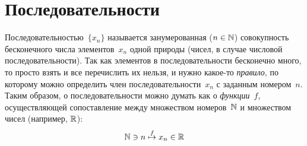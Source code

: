 \documentclass[a4paper,12pt]{article}
\begin{document}
  
  \section{Последовательности}
  
  Последовательностью~$\{x_n\}$ называется занумерованная ($n \hm\in \NN$) совокупность бесконечного числа элементов~$x_n$ одной природы (чисел, в случае числовой последовательности).
  Так как элементов в последовательности бесконечно много, то просто взять и все перечислить их нельзя, и нужно какое-то \emph{правило}, по которому можно определить член последовательности~$x_n$ с заданным номером~$n$.
  Таким образом, о последовательности можно думать как о \emph{функции}~$f$, осуществляющей сопоставление между множеством номеров~$\mathbb N$ и множеством чисел (например, $\operatorname{\mathbb R}$):
  \[
    \mathbb N \ni n \overset{f}{\mapsto} x_n \in \operatorname{\mathbb R}
  \]
  
\end{document}
